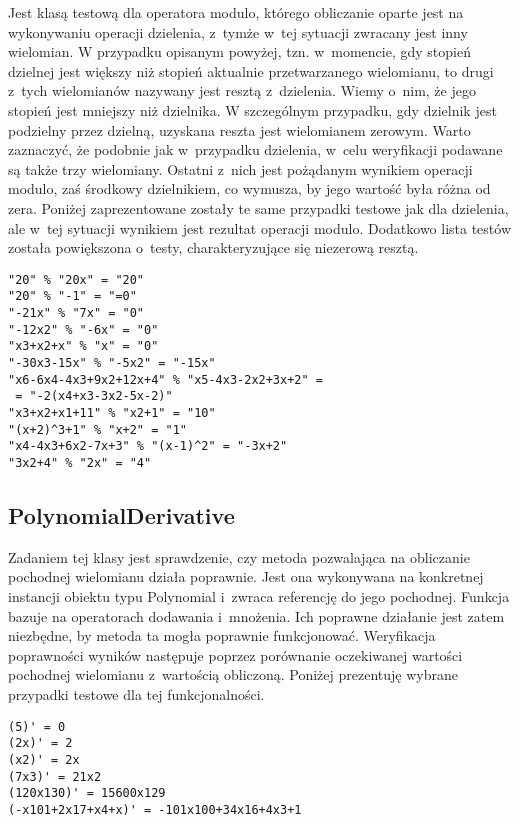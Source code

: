 Jest klasą testową dla operatora modulo, którego obliczanie oparte jest na wykonywaniu operacji dzielenia, z~tymże w~tej sytuacji zwracany jest inny wielomian. W przypadku opisanym powyżej, tzn. w~momencie, gdy stopień dzielnej jest większy niż stopień aktualnie przetwarzanego wielomianu, to drugi z~tych wielomianów nazywany jest resztą z~dzielenia. Wiemy o~nim, że jego stopień jest mniejszy niż dzielnika. W szczególnym przypadku, gdy dzielnik jest podzielny przez dzielną, uzyskana reszta jest wielomianem zerowym. Warto zaznaczyć, że podobnie jak w~przypadku dzielenia, w~celu weryfikacji podawane są także trzy wielomiany. Ostatni z~nich jest pożądanym wynikiem operacji modulo, zaś środkowy dzielnikiem, co wymusza, by jego wartość była różna od zera. Poniżej zaprezentowane zostały te same przypadki testowe jak dla dzielenia, ale w~tej sytuacji wynikiem jest rezultat operacji modulo. Dodatkowo lista testów została powiększona o~testy, charakteryzujące się niezerową resztą.

\begin{lstlisting}
"20" % "20x" = "20"
"20" % "-1" = "=0"
"-21x" % "7x" = "0"
"-12x2" % "-6x" = "0"
"x3+x2+x" % "x" = "0"
"-30x3-15x" % "-5x2" = "-15x"
"x6-6x4-4x3+9x2+12x+4" % "x5-4x3-2x2+3x+2" =
 = "-2(x4+x3-3x2-5x-2)"
"x3+x2+x1+11" % "x2+1" = "10"
"(x+2)^3+1" % "x+2" = "1"
"x4-4x3+6x2-7x+3" % "(x-1)^2" = "-3x+2"
"3x2+4" % "2x" = "4"
\end{lstlisting}

\subsection{PolynomialDerivative}

Zadaniem tej klasy jest sprawdzenie, czy metoda pozwalająca na obliczanie pochodnej wielomianu działa poprawnie. Jest ona wykonywana na konkretnej instancji obiektu typu Polynomial i~zwraca referencję do jego pochodnej. Funkcja bazuje na operatorach dodawania i~mnożenia. Ich poprawne działanie jest zatem niezbędne, by metoda ta mogła poprawnie funkcjonować.
Weryfikacja poprawności wyników następuje poprzez porównanie oczekiwanej wartości pochodnej wielomianu z~wartością obliczoną. Poniżej prezentuję wybrane przypadki testowe dla tej funkcjonalności.

\begin{lstlisting}
(5)' = 0
(2x)' = 2
(x2)' = 2x
(7x3)' = 21x2
(120x130)' = 15600x129
(-x101+2x17+x4+x)' = -101x100+34x16+4x3+1
\end{lstlisting}

